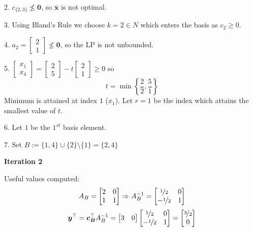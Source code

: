 \begin{exbox}
\begin{example}
        2. $ c_{\{2,3\}} \nleq \bm{0} $, so $ \bm{\bar{x}} $ is not optimal.

        3. Using Bland's Rule we choose $ k=2\in N $ which enters the basis
        as $ c_2\geqslant  0 $.

        4.
        $
            a_2= \begin{bmatrix}
                2 \\
                1
            \end{bmatrix}\nleq \bm{0}
        $, so the LP is not unbounded.

        5.
        $
            \begin{bmatrix}
                x_1 \\
                x_4
            \end{bmatrix}
            =
            \begin{bmatrix}
                2 \\
                5
            \end{bmatrix}-t
            \begin{bmatrix}
                2 \\
                1
            \end{bmatrix}\geqslant  0
        $
        so
        \[ t=\min \left\{\frac{2}{2},\frac{5}{1} \right\} \]
        Minimum is attained at index $ 1 $ ($ x_1 $). Let $ r=1 $ be the index which attains the smallest value of $ t $.

        6. Let $ 1 $ be the $ 1^{st} $ basis element.

        7. Set $ B:=\{1,4\}\cup \{2\}\setminus\{1\}=\{2,4\} $

        \textbf{Iteration 2}

        Useful values computed:
        \[ A_B=
            \begin{bmatrix}
                2 & 0 \\
                1 & 1 \\
            \end{bmatrix} \Rightarrow
            A_B^{-1}=
            \begin{bmatrix}
                \nicefrac{1}{2}  & 0 \\
                -\nicefrac{1}{2} & 1 \\
            \end{bmatrix} \]
        \[ \bm{y}^\top=\bm{c_B}^\top A_B^{-1}=
            \begin{bmatrix}
                3 & 0
            \end{bmatrix}
            \begin{bmatrix}
                \nicefrac{1}{2}  & 0 \\
                -\nicefrac{1}{2} & 1 \\
            \end{bmatrix}=
            \begin{bmatrix}
                \nicefrac{3}{2} \\
                0
            \end{bmatrix}\]


\end{example}
\end{exbox}
